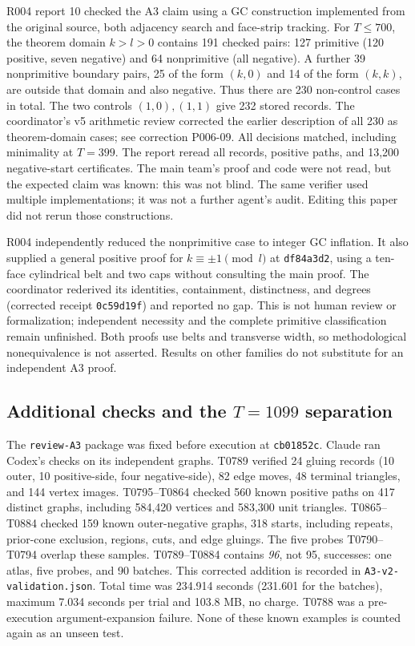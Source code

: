 \documentclass[11pt]{amsart}
\newcommand{\record}[1]{\nolinkurl{#1}}
\begin{document}
R004 report 10 checked the A3 claim using a GC construction implemented
from the original source, both adjacency search and face-strip tracking.
For $T\le700$, the theorem domain $k>l>0$ contains 191 checked pairs:
127 primitive (120 positive, seven negative) and 64 nonprimitive
(all negative). A further 39 nonprimitive boundary pairs, 25 of the form
$(k,0)$ and 14 of the form $(k,k)$, are outside that domain and also
negative. Thus there are 230 non-control cases in total. The two controls
$(1,0),(1,1)$ give 232 stored records. The coordinator's v5 arithmetic
review corrected the earlier description of all 230 as theorem-domain
cases; see correction P006-09. All decisions matched, including
minimality at $T=399$. The report reread all records, positive paths,
and 13,200 negative-start certificates. The main team's proof and code
were not read, but the expected claim was known: this was not blind.
The same verifier used multiple implementations; it was not a further
agent's audit. Editing this paper did not rerun those constructions.

R004 independently reduced the nonprimitive case to integer GC
inflation. It also supplied a general positive proof for
$k\equiv\pm1\pmod l$ at \record{df84a3d2}, using a ten-face cylindrical
belt and two caps without consulting the main proof. The coordinator
rederived its identities, containment, distinctness, and degrees
(corrected receipt \record{0c59d19f}) and reported no gap. This is not
human review or formalization; independent necessity and the complete
primitive classification remain unfinished. Both proofs use belts and
transverse width, so methodological nonequivalence is not asserted.
Results on other families do not substitute for an independent A3 proof.

\subsection{Additional checks and the \texorpdfstring{$T=1099$}{T=1099} separation}
The \record{review-A3} package was fixed before execution at
\record{cb01852c}. Claude ran Codex's checks on its independent graphs.
T0789 verified 24 gluing records (10 outer, 10 positive-side, four
negative-side), 82 edge moves, 48 terminal triangles, and 144 vertex
images. T0795--T0864 checked 560 known positive paths on 417 distinct
graphs, including 584,420 vertices and 583,300 unit triangles.
T0865--T0884 checked 159 known outer-negative graphs, 318 starts,
including repeats, prior-cone exclusion, regions, cuts, and edge gluings.
The five probes T0790--T0794 overlap these samples. T0789--T0884
contains \emph{96}, not 95, successes: one atlas, five probes, and
90 batches. This corrected addition is recorded in
\record{A3-v2-validation.json}. Total time was 234.914 seconds (231.601
for the batches), maximum 7.034 seconds per trial and 103.8 MB, no
charge. T0788 was a pre-execution argument-expansion failure. None of
these known examples is counted again as an unseen test.
\end{document}
